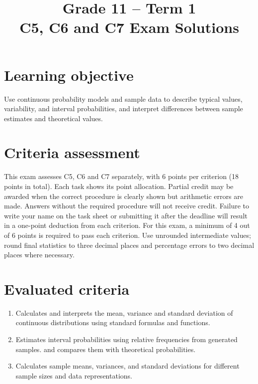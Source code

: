 \makeatletter
{}
\makeatother



\title{Grade 11 -- Term 1 \\ C5, C6 and C7 Exam Solutions}
\author{}
\date{}


\maketitle
\vspace{-2cm}
\setcounter{tocdepth}{1}
\setcounter{secnumdepth}{2}
\label{toc}
\tableofcontents

\section*{Learning objective}\vspace{-5mm}
Use continuous probability models and sample data to describe typical values,
variability, and interval probabilities, and interpret differences between
sample estimates and theoretical values.

\section*{Criteria assessment}\vspace{-5mm}
This exam assesses C5, C6 and C7 separately, with 6 points per criterion
(18 points in total). Each task shows its point allocation. Partial credit
may be awarded when the correct procedure is clearly shown but arithmetic
errors are made. Answers without the required procedure will not receive credit.
Failure to write your name on the task sheet or submitting it after the deadline
will result in a one-point deduction from each criterion.
For this exam, a minimum of 4 out of 6 points is required to pass each criterion.
Use unrounded intermediate values; round final statistics to three decimal
places and percentage errors to two decimal places where necessary.

\section*{Evaluated criteria}
\begin{enumerate}[label=\textbf{C\arabic*},start=5]
\item Calculates and interprets the mean, variance and standard deviation of continuous distributions using standard formulas and functions.
\item Estimates interval probabilities using relative frequencies from generated samples.
 and compares them with theoretical probabilities.
\item Calculates sample means, variances, and standard deviations for different sample sizes and data representations.
\end{enumerate}


